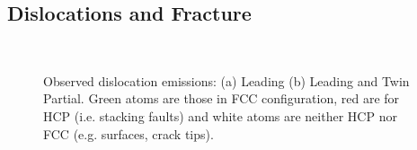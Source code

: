 \documentclass{article}
\begin{document}
\subsection{Dislocations and Fracture} \label{apd_sct:fracturedislocation_images}


\begin{figure}[H]%
\centering%
%
%
\\
\caption{Observed dislocation emissions: (a) Leading (b) Leading and Twin Partial.
Green atoms are those in FCC configuration, red are for HCP (i.e. stacking faults) and white atoms are neither HCP nor FCC (e.g. surfaces, crack tips).}
\label{fig:fracturedislocation_images}
\end{figure}
\end{document}
